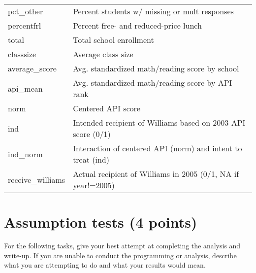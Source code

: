 \documentclass[a4paper, 11pt]{article}
\begin{document}
\begin{table}[!htbp]
\begin{tabular}{ll}
pct\_other & Percent students w/ missing or mult responses \\
percentfrl & Percent free- and reduced-price lunch \\
total & Total school enrollment \\
classsize & Average class size \\
average\_score & Avg. standardized math/reading score by school \\
api\_mean & Avg. standardized math/reading score by API rank \\
norm & Centered API score \\
ind & Intended recipient of Williams based on 2003 API score (0/1) \\
ind\_norm & Interaction of centered API (norm) and intent to treat (ind) \\
receive\_williams & Actual recipient of Williams in 2005 (0/1, NA if year!=2005) \\
\hline
\hline

\end{tabular}
\end{table}

\section{Assumption tests (4 points)}
For the following tasks, give your best attempt at completing the analysis and write-up. If you are unable to conduct the programming or analysis, describe what you are attempting to do and what your results would mean.
\end{document}
